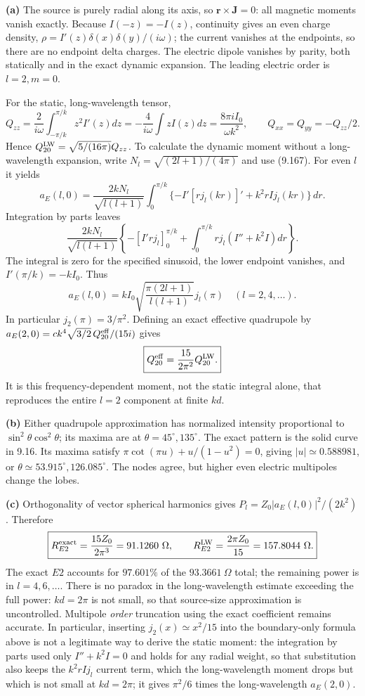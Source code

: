 \textbf{(a)} The source is purely radial along its axis, so
$\mathbf r\times\mathbf J=0$: all magnetic moments vanish exactly.
Because $I(-z)=-I(z)$, continuity gives an even charge density,
$\rho=I'(z)\delta(x)\delta(y)/(i\omega)$; the current vanishes at the
endpoints, so there are no endpoint delta charges. The electric dipole
vanishes by parity, both statically and in the exact dynamic expansion.
The leading electric order is $l=2,m=0$.

For the static, long-wavelength tensor,
\[
Q_{zz}=\frac2{i\omega}\int_{-\pi/k}^{\pi/k}z^2 I'(z)dz
=-\frac4{i\omega}\int zI(z)dz
=\frac{8\pi iI_0}{\omega k^2},\qquad
Q_{xx}=Q_{yy}=-Q_{zz}/2.
\]
Hence $Q_{20}^{\rm LW}=\sqrt{5/(16\pi)}Q_{zz}$.
To calculate the dynamic moment without a long-wavelength expansion,
write $N_l=\sqrt{(2l+1)/(4\pi)}$ and use (9.167). For even $l$ it yields
\[
a_E(l,0)=\frac{2kN_l}{\sqrt{l(l+1)}}\int_0^{\pi/k}
\{-I'[rj_l(kr)]'+k^2rI j_l(kr)\}\,dr.
\]
Integration by parts leaves
\[
\frac{2kN_l}{\sqrt{l(l+1)}}
\left\{-[I'rj_l]_0^{\pi/k}
+\int_0^{\pi/k}rj_l(I''+k^2I)dr\right\}.
\]
The integral is zero for the specified sinusoid, the lower endpoint
vanishes, and $I'(\pi/k)=-kI_0$. Thus
\[
\boxed{a_E(l,0)=kI_0\sqrt{\frac{\pi(2l+1)}{l(l+1)}}j_l(\pi)
\quad(l=2,4,\ldots).}
\]
In particular $j_2(\pi)=3/\pi^2$. Defining an exact effective quadrupole
by $a_E(2,0)=ck^4\sqrt{3/2}\,Q_{20}^{\rm eff}/(15i)$ gives
\[
\boxed{Q_{20}^{\rm eff}=\frac{15}{2\pi^2}Q_{20}^{\rm LW}.}
\]
It is this frequency-dependent moment, not the static integral alone,
that reproduces the entire $l=2$ component at finite $kd$.

\textbf{(b)} Either quadrupole approximation has normalized intensity
proportional to $\sin^2\theta\cos^2\theta$; its maxima are at
$\theta=45^\circ,135^\circ$. The exact pattern is the solid curve in
9.16. Its maxima satisfy
$\pi\cot(\pi u)+u/(1-u^2)=0$, giving
$|u|\simeq0.588981$, or $\theta\simeq53.915^\circ,126.085^\circ$.
The nodes agree, but higher even electric multipoles change the lobes.

\textbf{(c)} Orthogonality of vector spherical harmonics gives
$P_l=Z_0|a_E(l,0)|^2/(2k^2)$. Therefore
\[
\boxed{R_{E2}^{\rm exact}=\frac{15Z_0}{2\pi^3}=91.1260\ \Omega,
\qquad
R_{E2}^{\rm LW}=\frac{2\pi Z_0}{15}=157.8044\ \Omega.}
\]
The exact $E2$ accounts for $97.601\%$ of the $93.3661\ \Omega$ total;
the remaining power is in $l=4,6,\ldots$.
There is no paradox in the long-wavelength estimate exceeding the full
power: $kd=2\pi$ is not small, so that source-size approximation is
uncontrolled. Multipole \emph{order} truncation using the exact coefficient
remains accurate. In particular, inserting $j_2(x)\simeq x^2/15$ into
the boundary-only formula above is not a legitimate way to derive the
static moment: the integration by parts used only $I''+k^2I=0$ and
holds for any radial weight, so that substitution also keeps the
$k^2rIj_l$ current term, which the long-wavelength moment drops but
which is not small at $kd=2\pi$; it gives $\pi^2/6$ times the
long-wavelength $a_E(2,0)$.

